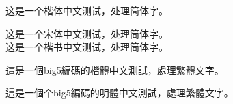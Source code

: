 \documentclass{article}
\begin{document}
\begin{CJK}{UTF8}{gkai}
这是一个楷体中文测试，处理简体字。
\end{CJK}

\begin{CJK}{UTF8}{gbsn}
这是一个宋体中文测试，处理简体字。\\
这是一个楷书中文测试，处理简体字。\\
\end{CJK}

\begin{CJK}{UTF8}{bkai}
這是一個big5編碼的楷體中文測試，處理繁體文字。
\end{CJK}

\begin{CJK}{UTF8}{bsmi}
這是一個个big5編碼的明體中文測試，處理繁體文字。
\end{CJK}
\end{document}
